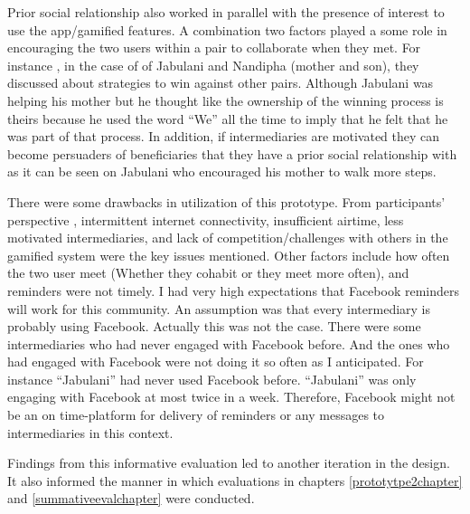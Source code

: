Prior social relationship also worked in parallel with the presence of interest to use the app/gamified features. A combination two factors played a some role in  encouraging the two users within a pair to collaborate when they met. For instance , in the case of of Jabulani and Nandipha (mother and son), they discussed about strategies to win against other pairs. Although Jabulani was helping his mother but he thought like the ownership of the winning process is theirs because he used the word ``We'' all the time to imply that he felt that he was part of that process. In addition, if intermediaries are motivated they can become persuaders of beneficiaries that they have a prior social relationship with as it can be seen on Jabulani who encouraged his mother to walk more steps.

There were some drawbacks in utilization of this prototype. From participants' perspective , intermittent internet connectivity, insufficient airtime, less motivated intermediaries, and lack of competition/challenges with others in the gamified system were the key issues mentioned. Other factors include how often the two user meet (Whether they cohabit or they meet more often), and reminders were not timely. I had very high expectations that Facebook reminders will work for this community. An assumption was that every intermediary is probably using Facebook. Actually this was not the case. There were some intermediaries who had never engaged with Facebook before. And the ones who had engaged with Facebook were not doing it so often as I anticipated. For instance ``Jabulani'' had never used Facebook before. ``Jabulani'' was only engaging with Facebook at most twice in a week. Therefore, Facebook might not be an on time-platform for delivery of reminders or any messages to intermediaries in this context.  

Findings from this informative evaluation led to another iteration in the design. It also informed the manner in which evaluations in chapters \ref{prototytpe2chapter} and \ref{summativeevalchapter} were conducted.
\begin{flushright}
\end{flushright}
